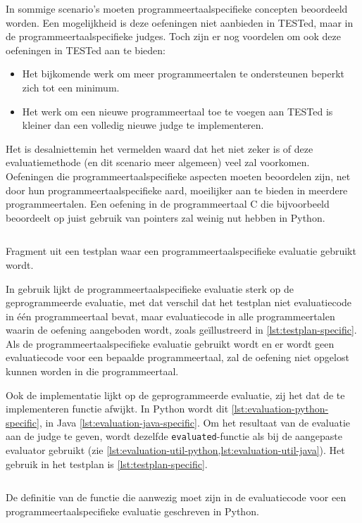 In sommige scenario's moeten programmeertaalspecifieke concepten beoordeeld worden.
Een mogelijkheid is deze oefeningen niet aanbieden in TESTed, maar in de programmeertaalspecifieke judges.
Toch zijn er nog voordelen om ook deze oefeningen in TESTed aan te bieden:
\begin{itemize}
    \item Het bijkomende werk om meer programmeertalen te ondersteunen beperkt zich tot een minimum.
    \item Het werk om een nieuwe programmeertaal toe te voegen aan TESTed is kleiner dan een volledig nieuwe judge te implementeren.
\end{itemize}
Het is desalniettemin het vermelden waard dat het niet zeker is of deze evaluatiemethode (en dit scenario meer algemeen) veel zal voorkomen.
Oefeningen die programmeertaalspecifieke aspecten moeten beoordelen zijn, net door hun programmeertaalspecifieke aard, moeilijker aan te bieden in meerdere programmeertalen.
Een oefening in de programmeertaal C die bijvoorbeeld beoordeelt op juist gebruik van pointers zal weinig nut hebben in Python.

\begin{listing}
    \inputminted{json}{code/testplan-specific.json}
    \caption{Fragment uit een testplan waar een programmeertaalspecifieke evaluatie gebruikt wordt.}
    \label{lst:testplan-specific}
\end{listing}

In gebruik lijkt de programmeertaalspecifieke evaluatie sterk op de geprogrammeerde evaluatie, met dat verschil dat het testplan niet evaluatiecode in één programmeertaal bevat, maar evaluatiecode in alle programmeertalen waarin de oefening aangeboden wordt, zoals geïllustreerd in \cref{lst:testplan-specific}.
Als de programmeertaalspecifieke evaluatie gebruikt wordt en er wordt geen evaluatiecode voor een bepaalde programmeertaal, zal de oefening niet opgelost kunnen worden in die programmeertaal.

Ook de implementatie lijkt op de geprogrammeerde evaluatie, zij het dat de te implementeren functie afwijkt.
In Python wordt dit \cref{lst:evaluation-python-specific}, in Java \cref{lst:evaluation-java-specific}.
Om het resultaat van de evaluatie aan de judge te geven, wordt dezelfde \texttt{evaluated}-functie als bij de aangepaste evaluator gebruikt (zie \cref{lst:evaluation-util-python,lst:evaluation-util-java}).
Het gebruik in het testplan is \cref{lst:testplan-specific}.

\begin{listing}
    \inputminted{python}{code/specific_signature.py}
    \caption{De definitie van de functie die aanwezig moet zijn in de evaluatiecode voor een programmeertaalspecifieke evaluatie geschreven in Python.}
    \label{lst:evaluation-python-specific}
\end{listing}

